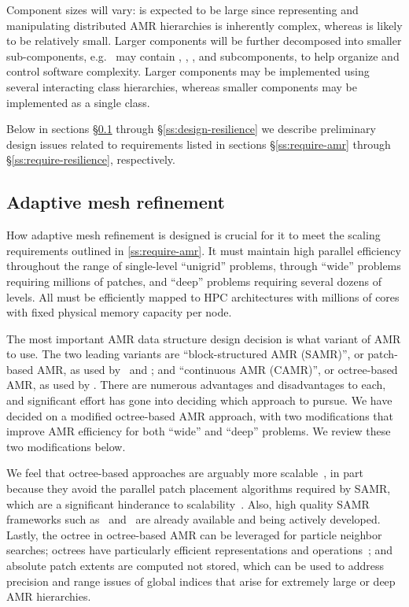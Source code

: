 \documentclass[10pt,twocolumn]{article}
\begin{document}
Component sizes will vary:  is expected to be large since
representing and manipulating distributed AMR hierarchies is
inherently complex, whereas  is likely to be relatively
small.  Larger components will be further decomposed into smaller
sub-components, e.g.~ may contain , ,
, and  subcomponents, to help organize and
control software complexity.  Larger components may be implemented
using several interacting class hierarchies, whereas smaller
components may be implemented as a single class.

Below in sections \S\ref{ss:design-amr} through
\S\ref{ss:design-resilience} we describe preliminary design issues
related to requirements listed in sections \S\ref{ss:require-amr}
through \S\ref{ss:require-resilience}, respectively.

\subsection{Adaptive mesh refinement} \label{ss:design-amr}

How adaptive mesh refinement is designed is crucial for it to meet the
scaling requirements outlined in \ref{ss:require-amr}.  It must
maintain high parallel efficiency throughout the range of single-level
``unigrid'' problems, through ``wide'' problems requiring millions of
patches, and ``deep'' problems requiring several dozens of levels.
All must be efficiently mapped to HPC architectures with millions of
cores with fixed physical memory capacity per node.

The most important AMR data structure design decision is what variant
of AMR to use.  The two leading variants are ``block-structured AMR
(SAMR)'', or patch-based AMR, as used by \samrai\ and \chombo; and
``continuous AMR (CAMR)'', or octree-based AMR, as used by \paramesh.
There are numerous advantages and disadvantages to each, and
significant effort has gone into deciding which approach to pursue.
We have decided on a modified octree-based AMR approach, with two
modifications that improve AMR efficiency for both ``wide'' and
``deep'' problems.  We review these two modifications below.

We feel that octree-based approaches are arguably more
scalable~\cite{BuGh08}, in part because they avoid the parallel patch
placement algorithms required by SAMR, which are a significant
hinderance to scalability~\cite{GuWi06}.  Also, high quality SAMR
frameworks such as \chombo\ and \samrai\ are already available and
being actively developed.  Lastly, the octree in octree-based AMR can
be leveraged for particle neighbor searches; octrees have particularly
efficient representations and operations~\cite{FrPe02}; and absolute patch
extents are computed not stored, which can be used to address
precision and range issues of global indices that arise for extremely
large or deep AMR hierarchies.
\end{document}
